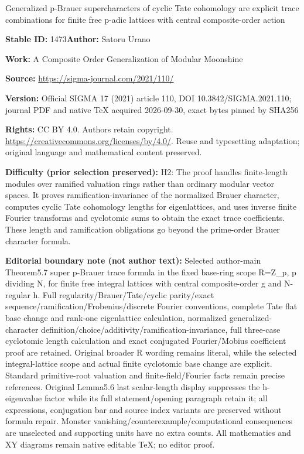 \documentclass[11pt]{article}
\numberwithin{equation}{section}
\numberwithin{equation}{section}
\begin{document}
\begin{center}\Large Generalized p-Brauer supercharacters of cyclic Tate cohomology are explicit trace combinations for finite free p-adic lattices with central composite-order action\end{center}
\noindent\textbf{Stable ID:} 1473\quad\textbf{Author:} Satoru Urano\par
\noindent\textbf{Work:} A Composite Order Generalization of Modular Moonshine\par
\noindent\textbf{Source:} \url{https://sigma-journal.com/2021/110/}\par
\noindent\textbf{Version:} Official SIGMA 17 (2021) article 110, DOI 10.3842/SIGMA.2021.110; journal PDF and native TeX acquired 2026-09-30, exact bytes pinned by SHA256\par
\noindent\textbf{Rights:} CC BY 4.0. Authors retain copyright. \url{https://creativecommons.org/licenses/by/4.0/}. Reuse and typesetting adaptation; original language and mathematical content preserved.\par
\noindent\textbf{Difficulty (prior selection preserved):} {\CJKfont H2: The proof handles finite-length modules over ramified valuation rings rather than ordinary modular vector spaces. It proves ramification-invariance of the normalized Brauer character, computes cyclic Tate cohomology lengths for eigenlattices, and uses inverse finite Fourier transforms and cyclotomic sums to obtain the exact trace coefficients. These length and ramification obligations go beyond the prime-order Brauer character formula.}\par
\medskip\noindent\textbf{Editorial boundary note (not author text):} Selected author-main Theorem5.7 super p-Brauer trace formula in the fixed base-ring scope R=Z\_p, p dividing N, for finite free integral lattices with central composite-order g and N-regular h. Full regularity/Brauer/Tate/cyclic parity/exact sequence/ramification/Frobenius/discrete Fourier conventions, complete Tate flat base change and rank-one eigenlattice calculation, normalized generalized-character definition/choice/additivity/ramification-invariance, full three-case cyclotomic length calculation and exact conjugated Fourier/Mobius coefficient proof are retained. Original broader R wording remains literal, while the selected integral-lattice scope and actual finite cyclotomic base change are explicit. Standard primitive-root valuation and finite-field/Fourier facts remain precise references. Original Lemma5.6 last scalar-length display suppresses the h-eigenvalue factor while its full statement/opening paragraph retain it; all expressions, conjugation bar and source index variants are preserved without formula repair. Monster vanishing/counterexample/computational consequences are unselected and supporting units have no extra counts. All mathematics and XY diagrams remain native editable TeX; no editor proof.\par
\end{document}
